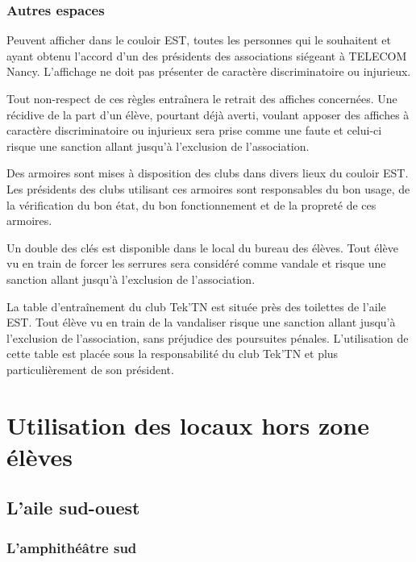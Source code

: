 \documentclass{article} %
\begin{document}
			\subsubsection{Autres espaces}
\label{ssub:autres_espaces}

				Peuvent afficher dans le couloir EST\@, toutes les personnes qui
				le souhaitent et ayant obtenu l’accord d’un des présidents des
				associations siégeant à TELECOM Nancy. L’affichage ne doit pas
				présenter de caractère discriminatoire ou injurieux.

				Tout non-respect de ces règles entraînera le retrait des
				affiches concernées. Une récidive de la part d’un élève,
				pourtant déjà averti, voulant apposer des affiches à caractère
				discriminatoire ou injurieux sera prise comme une faute et
				celui-ci risque une sanction allant jusqu’à l’exclusion de
				l’association.

				Des armoires sont mises à disposition des clubs dans divers
				lieux du couloir EST\@. Les présidents des clubs utilisant ces
				armoires sont responsables du bon usage, de la vérification du
				bon état, du bon fonctionnement et de la propreté de ces
				armoires. 

				Un double des clés est disponible dans le local du bureau des
				élèves. Tout élève vu en train de forcer les serrures sera
				considéré comme vandale et risque une sanction allant jusqu’à
				l’exclusion de l’association.

				La table d'entraînement du club Tek’TN est située près des
				toilettes de l’aile EST\@. Tout élève vu en train de la
				vandaliser risque une sanction allant jusqu’à l’exclusion de
				l’association, sans préjudice des poursuites pénales.
				L’utilisation de cette table est placée sous la responsabilité
				du club Tek’TN et plus particulièrement de son président.

	\section{Utilisation des locaux hors zone élèves}
\label{sec:utilisation_des_locaux_hors_zone_eleves}

		\subsection{L'aile sud-ouest}
\label{sub:l_aile_sud_ouest}

			\subsubsection{L'amphithéâtre sud}
\label{ssub:l_amphitheatre_sud}
\end{document}
